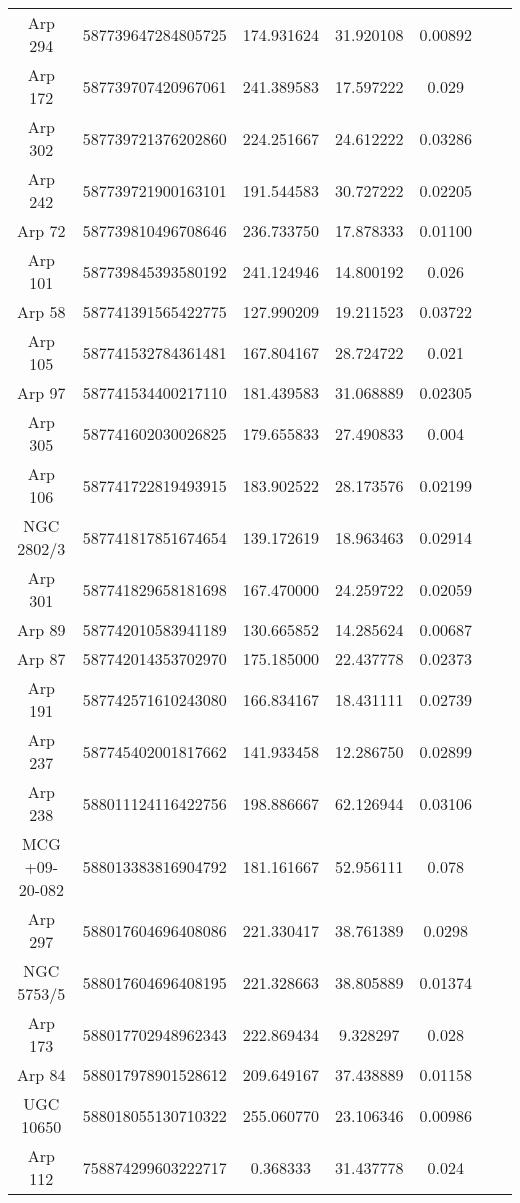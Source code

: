 \begin{table*}
{\begin{tabular}{|c|c|c|c|c|c|c|}
Arp 294 & 587739647284805725 & 174.931624 & 31.920108 & 0.00892 \\
Arp 172 & 587739707420967061 & 241.389583 & 17.597222 & 0.029 \\
Arp 302 & 587739721376202860 & 224.251667 & 24.612222 & 0.03286 \\
Arp 242 & 587739721900163101 & 191.544583 & 30.727222 & 0.02205 \\
Arp 72 & 587739810496708646 & 236.733750 & 17.878333 & 0.01100 \\
Arp 101 & 587739845393580192 & 241.124946 & 14.800192 & 0.026 \\
Arp 58 & 587741391565422775 & 127.990209 & 19.211523 & 0.03722 \\
Arp 105 & 587741532784361481 & 167.804167 & 28.724722 & 0.021 \\
Arp 97 & 587741534400217110 & 181.439583 & 31.068889 & 0.02305 \\
Arp 305 & 587741602030026825 & 179.655833 & 27.490833 & 0.004 \\
Arp 106 & 587741722819493915 & 183.902522 & 28.173576 & 0.02199 \\
NGC 2802/3 & 587741817851674654 & 139.172619 & 18.963463 & 0.02914 \\
Arp 301 & 587741829658181698 & 167.470000 & 24.259722 & 0.02059 \\
Arp 89 & 587742010583941189 & 130.665852 & 14.285624 & 0.00687 \\
Arp 87 & 587742014353702970 & 175.185000 & 22.437778 & 0.02373 \\
Arp 191 & 587742571610243080 & 166.834167 & 18.431111 & 0.02739 \\
Arp 237 & 587745402001817662 & 141.933458 & 12.286750 & 0.02899 \\
Arp 238 & 588011124116422756 & 198.886667 & 62.126944 & 0.03106 \\
MCG +09-20-082 & 588013383816904792 & 181.161667 & 52.956111 & 0.078 \\
Arp 297 & 588017604696408086 & 221.330417 & 38.761389 & 0.0298 \\
NGC 5753/5 & 588017604696408195 & 221.328663 & 38.805889 & 0.01374 \\
Arp 173 & 588017702948962343 & 222.869434 & 9.328297 & 0.028 \\
Arp 84 & 588017978901528612 & 209.649167 & 37.438889 & 0.01158 \\
UGC 10650 & 588018055130710322 & 255.060770 & 23.106346 & 0.00986 \\
Arp 112 & 758874299603222717 & 0.368333 & 31.437778 & 0.024 \\

\end{tabular}}
\end{table*}
